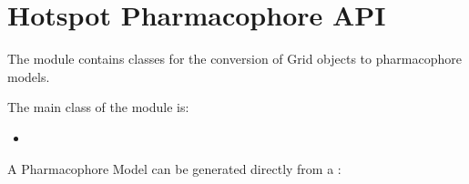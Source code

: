 \documentclass[letterpaper,10pt,english]{sphinxmanual}
\begin{document}
\begin{fulllineitems}
\begin{fulllineitems}
\begin{sphinxVerbatim}[commandchars=\\\{\}]
   
      
\PYG{p}{[}        \PYG{p}{]}
\end{sphinxVerbatim}

\end{fulllineitems}


\end{fulllineitems}



\chapter{Hotspot Pharmacophore API}
\label{\detokenize{hs_pharmacophore_api:module-hotspots.hs_pharmacophore}}\label{\detokenize{hs_pharmacophore_api:hotspot-pharmacophore-api}}\label{\detokenize{hs_pharmacophore_api::doc}}
The {\hyperref[\detokenize{hs_pharmacophore_api:module-hotspots.hs_pharmacophore}]{}} module contains classes for the
conversion of Grid objects to pharmacophore models.

The main class of the {\hyperref[\detokenize{hs_pharmacophore_api:module-hotspots.hs_pharmacophore}]{}} module is:
\begin{itemize}
\item {} 
{\hyperref[\detokenize{hs_pharmacophore_api:hotspots.hs_pharmacophore.PharmacophoreModel}]{}}

\end{itemize}

A Pharmacophore Model can be generated directly from a  :
\end{document}
